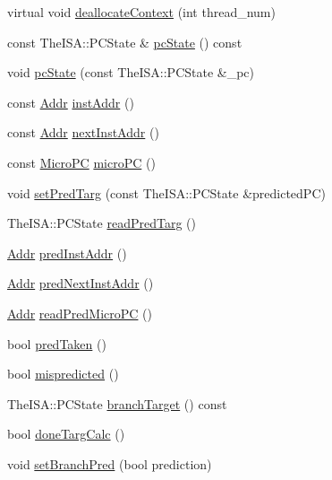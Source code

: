 \begin{DoxyCompactItemize}
virtual void \hyperlink{classInOrderDynInst_a93a6a65bef6878be7213d191e3d3c064}{deallocateContext} (int thread\_\-num)
\item 
const TheISA::PCState \& \hyperlink{classInOrderDynInst_a64fbed294723453b88abc510f3112df5}{pcState} () const 
\item 
void \hyperlink{classInOrderDynInst_a2e93bda333333e09701e1c003e3ba9a1}{pcState} (const TheISA::PCState \&\_\-pc)
\item 
const \hyperlink{base_2types_8hh_af1bb03d6a4ee096394a6749f0a169232}{Addr} \hyperlink{classInOrderDynInst_aec0a3c3b48572089565d1b1652bfcac3}{instAddr} ()
\item 
const \hyperlink{base_2types_8hh_af1bb03d6a4ee096394a6749f0a169232}{Addr} \hyperlink{classInOrderDynInst_a693483ad639fbfcedc7ee157b2ef0e81}{nextInstAddr} ()
\item 
const \hyperlink{base_2types_8hh_adfb4d8b20c5abc8be73dd367b16f2d57}{MicroPC} \hyperlink{classInOrderDynInst_aad0e6437d7a3cc30272bc0aec78db64a}{microPC} ()
\item 
void \hyperlink{classInOrderDynInst_a80e62e84695a013da86e43c7ed9ebeac}{setPredTarg} (const TheISA::PCState \&predictedPC)
\item 
TheISA::PCState \hyperlink{classInOrderDynInst_a8d36943d774b2b8b830a4be232f23360}{readPredTarg} ()
\item 
\hyperlink{base_2types_8hh_af1bb03d6a4ee096394a6749f0a169232}{Addr} \hyperlink{classInOrderDynInst_aaf7104129d287861faf7fe235f4116e7}{predInstAddr} ()
\item 
\hyperlink{base_2types_8hh_af1bb03d6a4ee096394a6749f0a169232}{Addr} \hyperlink{classInOrderDynInst_aabf159b9ae9ff5a404a04ef091d1f2d1}{predNextInstAddr} ()
\item 
\hyperlink{base_2types_8hh_af1bb03d6a4ee096394a6749f0a169232}{Addr} \hyperlink{classInOrderDynInst_acdc4199624829ee5de551179f240af8f}{readPredMicroPC} ()
\item 
bool \hyperlink{classInOrderDynInst_af7972cc57ec6d3c569bad2bc64a5183a}{predTaken} ()
\item 
bool \hyperlink{classInOrderDynInst_a821a18b4aa4e70533b1df605037062cd}{mispredicted} ()
\item 
TheISA::PCState \hyperlink{classInOrderDynInst_a066dfcf24b065ae319cc2d27aa4eb09c}{branchTarget} () const 
\item 
bool \hyperlink{classInOrderDynInst_a9a56f3bdfd0d5b331356265c62556516}{doneTargCalc} ()
\item 
void \hyperlink{classInOrderDynInst_a927efab2b8bc73bafd4b17592f115a09}{setBranchPred} (bool prediction)

\end{DoxyCompactItemize}
